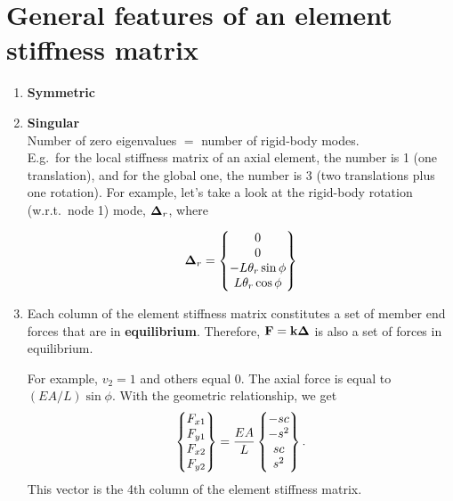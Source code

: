 \section{General features of an element stiffness matrix}
\begin{enumerate}[leftmargin=*]
  \item \textbf{Symmetric}
  \item \textbf{Singular}\\
    Number of zero eigenvalues $=$ number of rigid-body modes.\\
    E.g.\ for the local stiffness matrix of an axial element, the number is 1 (one translation), and for the global one, the number is 3 (two translations plus one rotation). For example, let's take a look at the rigid-body rotation (w.r.t.\ node 1) mode, $\bm{\Delta}_r$, where
    \begin{fig}
      \begin{minipage}{0.35\textwidth}
        \begin{equation*}
          \bm{\Delta}_r = \begin{Bmatrix}0\\ 0\\ -L\theta_r\sin\phi\\ L\theta_r\cos\phi\end{Bmatrix}
        \end{equation*}
      \end{minipage}
      \begin{minipage}{0.55\textwidth}
        \centering
      \end{minipage}
    \end{fig}
  \item Each column of the element stiffness matrix constitutes a set of member end forces that are in \textbf{equilibrium}. Therefore, $\mathbf{F} = \mathbf{k}\bm{\Delta}$ is also a set of forces in equilibrium.

    For example, $v_2 = 1$ and others equal 0. The axial force is equal to $(EA/L)\sin\phi$. With the geometric relationship, we get
    \begin{equation}
      \begin{Bmatrix}F_{x1}\\ F_{y1}\\ F_{x2}\\ F_{y2}\end{Bmatrix} = \frac{EA}{L}\begin{Bmatrix}-sc\\ -s^2\\ sc\\ s^2\end{Bmatrix}.
    \end{equation}
    This vector is the 4th column of the element stiffness matrix.
    \begin{fig}
      
    \end{fig}
\end{enumerate}
